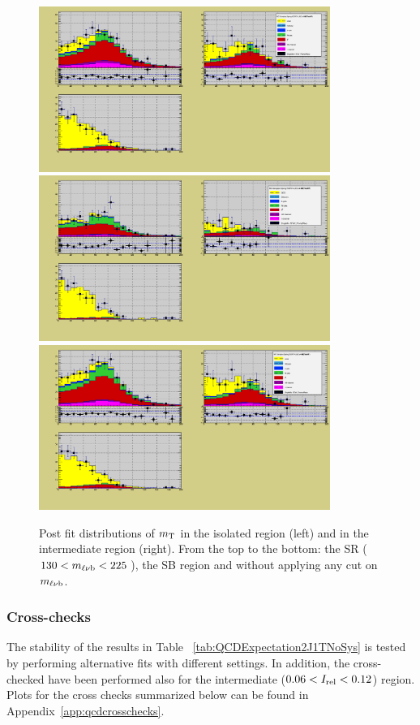 \begin{figure}[h!]
\begin{center}
\includegraphics[width=9.5cm]{figures/2J1T/MTW_Different_iso_regions_SR_postfit.png}
\includegraphics[width=9.5cm]{figures/2J1T/MTW_Different_iso_regions_SB_postfit.png}
\includegraphics[width=9.5cm]{figures/2J1T/MTW_Different_iso_regions_inclusive_mTop_postfit.png}
\caption{\label{fig:sampleComparisonDifferentIsoRegions2J1TmtWPostFit}  Post fit distributions of $m_{\mathrm{\rm T}}$ in the isolated region (left) and in the intermediate region (right). From the top to the bottom: the SR ($130<m_{\ell\nu \mathrm{b}}<225\,$\GeV), the SB region and  without applying any cut on $m_{\ell\nu \mathrm{b}}$.}
\end{center}
\end{figure}

\clearpage

\subsubsection{Cross-checks}
\label{sec:qcd2J1Txchecks}
The stability of the results in Table ~\ref{tab:QCDExpectation2J1TNoSys} is tested by performing alternative fits with different settings. In addition, the cross-checked have been performed also for the intermediate ($0.06 < I_{\mathrm{rel}} < 0.12$) region. Plots for the cross checks summarized below can be found in Appendix~\ref{app:qcdcrosschecks}.

